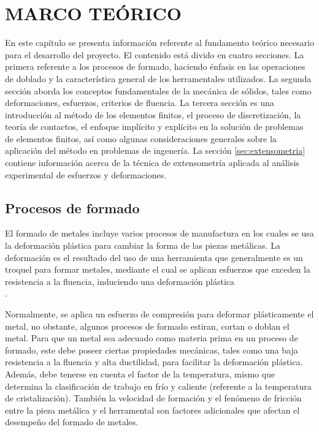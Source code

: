 % 
% 

\chapter{MARCO TEÓRICO}

En este capítulo se presenta información referente al fundamento teórico necesario para el 
desarrollo del proyecto. El contenido está divido en cuatro secciones. La primera referente 
a los procesos de formado, haciendo énfasis en las operaciones de doblado y la 
característica general de los herramentales utilizados. La segunda sección aborda 
los conceptos fundamentales de la mecánica de sólidos, tales como deformaciones, esfuerzos, 
criterios de fluencia. La tercera sección es una introducción al método de los elementos finitos, 
el proceso de discretización, la teoría de contactos, el enfoque implícito y explícito en 
la solución de problemas de elementos finitos, así como algunas consideraciones generales 
sobre la aplicación del método en problemas de ingenería. La sección \ref{sec:extensometria} 
contiene información acerca de la técnica de extensometría aplicada al análisis experimental 
de esfuerzos y deformaciones.

\section{Procesos de formado}

El formado de metales incluye varios procesos de manufactura en los cuales se usa la deformación 
plástica para cambiar la forma de las piezas metálicas. La deformación es el resultado del uso de 
una herramienta que generalmente es un troquel para formar metales, mediante el cual se aplican 
esfuerzos que exceden la resistencia a la fluencia, induciendo una deformación plástica 
~\cite{groover2007}\\.

Normalmente, se aplica un esfuerzo de compresión para deformar plásticamente el metal, no obstante, 
algunos procesos de formado estiran, cortan o doblan el metal. Para que un metal sea adecuado 
como materia prima en un proceso de formado, este debe poseer ciertas propiedades mecánicas, 
tales como una baja resistencia a la fluencia y alta ductilidad, para facilitar la deformación 
plástica. Además, debe tenerse en cuenta el factor de la temperatura, mismo que determina 
la clasificación de trabajo en frío y caliente (referente a la temperatura de cristalización). 
También la velocidad de formación y el fenómeno de fricción entre la pieza metálica y el herramental 
son factores adicionales que afectan el desempeño del formado de metales.\\

